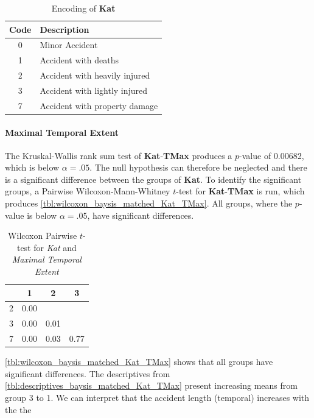 \begin{table}[!ht]
	\centering
	\small
	\begin{tabular}{c|l} 
		\toprule
		Code & Description \\ 
		\midrule
 		0 	& Minor Accident  \\
 		1 	& Accident with deaths  \\ 
 		2 	& Accident with heavily injured  \\
 		3 	& Accident with lightly injured  \\
		7 	& Accident with property damage  \\
		\bottomrule
	\end{tabular}
	\caption{Encoding of \textbf{Kat}}
	\label{table:analysis_encoding_Kat}
	\vspace{-8mm}
\end{table}

\paragraph{Maximal Temporal Extent}
The Kruskal-Wallis rank sum test of \textbf{Kat}-\textbf{TMax} produces a $p$-value of 0.00682, which is below $\alpha=.05$. The null hypothesis can therefore be neglected and there is a significant difference between the groups of \textbf{Kat}. To identify the significant groups, a Pairwise Wilcoxon-Mann-Whitney $t$-test for \textbf{Kat}-\textbf{TMax} is run, which produces \autoref{tbl:wilcoxon_baysis_matched_Kat_TMax}. All groups, where the $p$-value is below $\alpha=.05$, have significant differences. 
\begin{table}[ht]
	\small
	\centering
	\begin{tabular}{c|c|c|c}
	  	\toprule
	 	& 1 & 2 & 3 \\ 
	  	\midrule
		2 & 0.00 &  &  \\ 
	  	3 & 0.00 & 0.01 &  \\ 
	  	7 & 0.00 & 0.03 & 0.77 \\ 
	   	\bottomrule
	\end{tabular}
	\caption{Wilcoxon Pairwise $t$-test for \textit{Kat} and \textit{Maximal Temporal Extent}}
	\label{tbl:wilcoxon_baysis_matched_Kat_TMax}
\end{table}
\autoref{tbl:wilcoxon_baysis_matched_Kat_TMax} shows that all groups have significant differences. The descriptives from \autoref{tbl:descriptives_baysis_matched_Kat_TMax} present increasing means from group 3 to 1.	We can interpret that the accident length (temporal) increases with the the 

